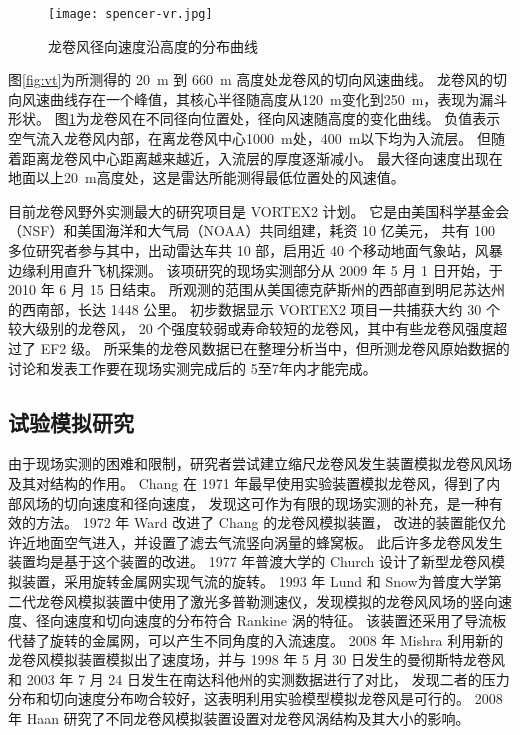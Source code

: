 \begin{figure}[!htbp]
    \centering
    \texttt{[image: spencer-vr.jpg]}
    \caption{龙卷风径向速度沿高度的分布曲线}
    \label{fig:vr}
\end{figure}

图\ref{fig:vt}为所测得的 \SI{20}{m} 到 \SI{660}{m} 高度处龙卷风的切向风速曲线。
龙卷风的切向风速曲线存在一个峰值，其核心半径随高度从\SI{120}{m}变化到\SI{250}{m}，表现为漏斗形状。
图\ref{fig:vr}为龙卷风在不同径向位置处，径向风速随高度的变化曲线。
负值表示空气流入龙卷风内部，在离龙卷风中心\SI{1000}{m}处，\SI{400}{m}以下均为入流层。
但随着距离龙卷风中心距离越来越近，入流层的厚度逐渐减小。
最大径向速度出现在地面以上\SI{20}{m}高度处，这是雷达所能测得最低位置处的风速值。

目前龙卷风野外实测最大的研究项目是 VORTEX2 计划。
它是由美国科学基金会（NSF）和美国海洋和大气局（NOAA）共同组建，耗资 10 亿美元，
共有 100 多位研究者参与其中，出动雷达车共 10 部，启用近 40 个移动地面气象站，风暴边缘利用直升飞机探测。
该项研究的现场实测部分从 2009 年 5 月 1 日开始，于 2010 年 6 月 15 日结束。
所观测的范围从美国德克萨斯州的西部直到明尼苏达州的西南部，长达 1448 公里。
初步数据显示 VORTEX2 项目一共捕获大约 30 个较大级别的龙卷风，
20 个强度较弱或寿命较短的龙卷风，其中有些龙卷风强度超过了 EF2 级。
所采集的龙卷风数据已在整理分析当中，但所测龙卷风原始数据的讨论和发表工作要在现场实测完成后的 5至7年内才能完成。

\subsection{试验模拟研究}
由于现场实测的困难和限制，研究者尝试建立缩尺龙卷风发生装置模拟龙卷风风场及其对结构的作用。
Chang \cite{chang1971tornado}在 1971 年最早使用实验装置模拟龙卷风，得到了内部风场的切向速度和径向速度，
发现这可作为有限的现场实测的补充，是一种有效的方法。
1972 年 Ward \cite{ward1972exploration}改进了 Chang 的龙卷风模拟装置，
改进的装置能仅允许近地面空气进入，并设置了滤去气流竖向涡量的蜂窝板。
此后许多龙卷风发生装置均是基于这个装置的改进。
1977 年普渡大学的 Church \cite{church1977tornado}设计了新型龙卷风模拟装置，采用旋转金属网实现气流的旋转。
1993 年 Lund 和 Snow为普度大学第二代龙卷风模拟装置中使用了激光多普勒测速仪，发现模拟的龙卷风风场的竖向速度、径向速度和切向速度的分布符合 Rankine 涡的特征。
该装置还采用了导流板代替了旋转的金属网，可以产生不同角度的入流速度。
2008 年 Mishra \cite{mishra2008physical}利用新的龙卷风模拟装置模拟出了速度场，并与 1998 年 5 月 30 日发生的曼彻斯特龙卷风和 2003 年 7 月 24 日发生在南达科他州的实测数据进行了对比，
发现二者的压力分布和切向速度分布吻合较好，这表明利用实验模型模拟龙卷风是可行的。
2008 年 Haan \cite{haan2009tornado}研究了不同龙卷风模拟装置设置对龙卷风涡结构及其大小的影响。

